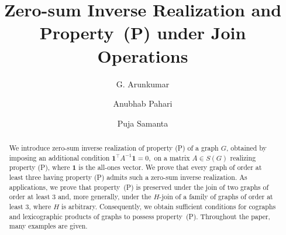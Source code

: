 \documentclass[12pt,reqno]{amsart}
\theoremstyle{definition}
\numberwithin{equation}{subsection}
\numberwithin{equation}{section}
\begin{document}
	
	\title{Zero-sum Inverse Realization and Property~(P) under
Join Operations}

   \author{G. Arunkumar}
	\address{Indian Institute of Technology Madras, Chennai, India.}
    
    \author{Anubhab Pahari}
	\address{Indian Institute of Technology Madras, Chennai, India.}
    
	\author{Puja Samanta}
	\address{Indian Institute of Technology Madras, Chennai, India.}
 
	
	

	
	


\begin{abstract}
We introduce zero-sum inverse realization of property (P) of a graph $G$, obtained by imposing an additional condition
\(
\mathbf{1}^{\top}A^{-1}\mathbf{1}=0,
\)
on a matrix $A\in S(G)$ realizing property (P), where $\mathbf{1}$ is the all-ones vector.
We prove that every graph of order at least three having property (P) admits such a zero-sum inverse realization. As applications, we prove that property~(P) is preserved under the join of two graphs of order at least $3$ and, more generally, under the $H$-join of a family of graphs of order at least $3$, where $H$ is arbitrary. Consequently, we obtain sufficient conditions for cographs and lexicographic products of graphs to possess property~(P). Throughout the paper, many examples are given.
\end{abstract}
\end{document}
